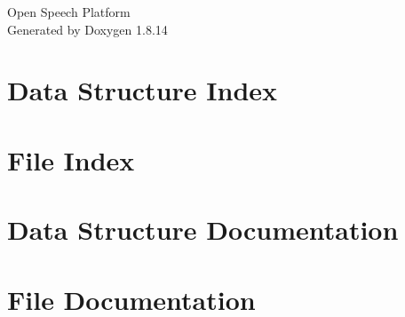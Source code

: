 \documentclass[twoside]{book}
\newcommand{\+}{\discretionary{\mbox{\scriptsize$\hookleftarrow$}}{}{}}
\newcommand{\clearemptydoublepage}{%
  \newpage{\pagestyle{empty}\cleardoublepage}%
}
\begin{document}
\hypersetup{pageanchor=false,
             bookmarksnumbered=true,
             pdfencoding=unicode
            }
\begin{titlepage}
\vspace*{7cm}
\begin{center}%
{\Large Open Speech Platform }\\
\vspace*{1cm}
{\large Generated by Doxygen 1.8.14}\\
\end{center}
\end{titlepage}
\clearemptydoublepage
{}
\tableofcontents
\clearemptydoublepage
{}
\hypersetup{pageanchor=true}

\chapter{Data Structure Index}

\chapter{File Index}

\chapter{Data Structure Documentation}















\chapter{File Documentation}













































\backmatter
\newpage
{}
\clearemptydoublepage
{}
\printindex
\end{document}
